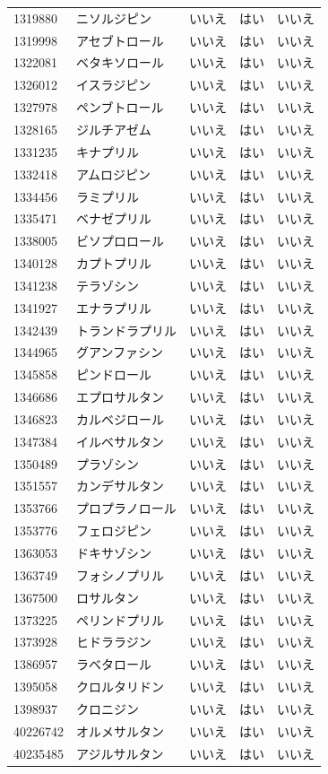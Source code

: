 \documentclass[
  11pt]{book}
\theoremstyle{definition}
\theoremstyle{definition}
\theoremstyle{definition}
\theoremstyle{definition}
\theoremstyle{remark}
\begin{document}
\begin{longtable}[]{@{}lllll@{}}
1319880 & ニソルジピン & いいえ & はい & いいえ \\
1319998 & アセブトロール & いいえ & はい & いいえ \\
1322081 & ベタキソロール & いいえ & はい & いいえ \\
1326012 & イスラジピン & いいえ & はい & いいえ \\
1327978 & ペンブトロール & いいえ & はい & いいえ \\
1328165 & ジルチアゼム & いいえ & はい & いいえ \\
1331235 & キナプリル & いいえ & はい & いいえ \\
1332418 & アムロジピン & いいえ & はい & いいえ \\
1334456 & ラミプリル & いいえ & はい & いいえ \\
1335471 & ベナゼプリル & いいえ & はい & いいえ \\
1338005 & ビソプロロール & いいえ & はい & いいえ \\
1340128 & カプトプリル & いいえ & はい & いいえ \\
1341238 & テラゾシン & いいえ & はい & いいえ \\
1341927 & エナラプリル & いいえ & はい & いいえ \\
1342439 & トランドラプリル & いいえ & はい & いいえ \\
1344965 & グアンファシン & いいえ & はい & いいえ \\
1345858 & ピンドロール & いいえ & はい & いいえ \\
1346686 & エプロサルタン & いいえ & はい & いいえ \\
1346823 & カルベジロール & いいえ & はい & いいえ \\
1347384 & イルベサルタン & いいえ & はい & いいえ \\
1350489 & プラゾシン & いいえ & はい & いいえ \\
1351557 & カンデサルタン & いいえ & はい & いいえ \\
1353766 & プロプラノロール & いいえ & はい & いいえ \\
1353776 & フェロジピン & いいえ & はい & いいえ \\
1363053 & ドキサゾシン & いいえ & はい & いいえ \\
1363749 & フォシノプリル & いいえ & はい & いいえ \\
1367500 & ロサルタン & いいえ & はい & いいえ \\
1373225 & ペリンドプリル & いいえ & はい & いいえ \\
1373928 & ヒドララジン & いいえ & はい & いいえ \\
1386957 & ラベタロール & いいえ & はい & いいえ \\
1395058 & クロルタリドン & いいえ & はい & いいえ \\
1398937 & クロニジン & いいえ & はい & いいえ \\
40226742 & オルメサルタン & いいえ & はい & いいえ \\
40235485 & アジルサルタン & いいえ & はい & いいえ \\
\end{longtable}
\end{document}
